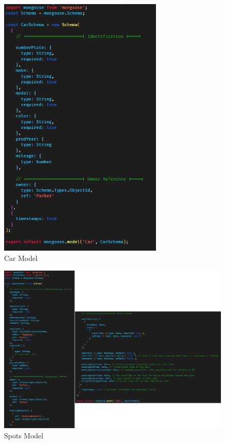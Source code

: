         \begin{figure}[h]
            \centering
            \includegraphics[width=0.7\textwidth]{images/carsModel.png}
            \caption{Car Model}
            \label{fig:carsModel}
        \end{figure}

        \begin{figure}[h]
            \centering
            \includegraphics[width=1\textwidth]{images/spotModel.png}
            \caption{Spots Model}
            \label{fig:spotModel}
        \end{figure}


